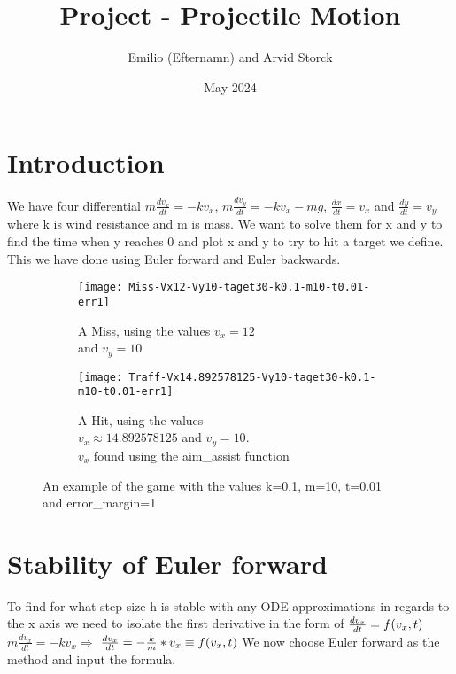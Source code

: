 \documentclass{article}
\title{Project - Projectile Motion}
\author{Emilio (Efternamn) and Arvid Storck}
\date{May 2024}
\begin{document}
\maketitle
\section{Introduction}
We have four differential $m\frac{dv_x}{dt}=-kv_x$, $m\frac{dv_y}{dt}=-kv_x-mg$, $\frac{dx}{dt}=v_x$ and $\frac{dy}{dt}=v_y$ where k is wind resistance and m is mass. We want to solve them for x and y to find the time when y reaches 0 and plot x and y to try to hit a target we define. This we have done using Euler forward and Euler backwards.

\begin{figure}[h]

\begin{subfigure}{0.45\textwidth}
\texttt{[image: Miss-Vx12-Vy10-taget30-k0.1-m10-t0.01-err1]} 
\caption{A Miss, using the values $v_x=12$\\ and $v_y=10$\\ }
\label{fig:subim1}
\end{subfigure}
\begin{subfigure}{0.45\textwidth}
\texttt{[image: Traff-Vx14.892578125-Vy10-taget30-k0.1-m10-t0.01-err1]}
\caption{A Hit, using the values\\ $v_x\approx14.892578125$ and $v_y=10$.\\$v_x$ found using the aim\_assist function}
\label{fig:subim2}
\end{subfigure}

\caption{An example of the game with the values k=0.1, m=10, t=0.01\\ and error\_margin=1}
\label{fig:image2}
\end{figure}

\section{Stability of Euler forward}

To find for what step size h is stable with any ODE approximations in regards to the x axis we need to isolate the first derivative in the form of $\frac{dv_x}{dt}=f(v_x,t)\newline\newline$
$m\frac{dv_x}{dt}=-kv_x\Rightarrow$
$\frac{dv_x}{dt}=-\frac{k}{m}*v_x\equiv f(v_x,t)\newline\newline$
We now choose Euler forward as the method and input the formula.
\end{document}

